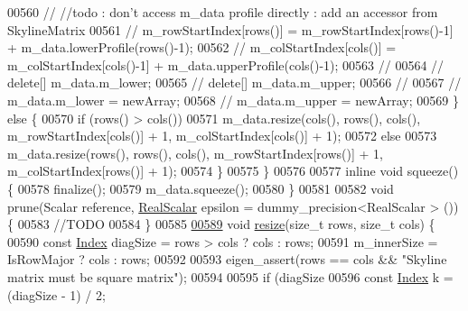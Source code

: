 \begin{DoxyCode}
00560             \textcolor{comment}{//            //todo : don't access m\_data profile directly : add an accessor from
       SkylineMatrix}
00561             \textcolor{comment}{//            m\_rowStartIndex[rows()] = m\_rowStartIndex[rows()-1] +
       m\_data.lowerProfile(rows()-1);}
00562             \textcolor{comment}{//            m\_colStartIndex[cols()] = m\_colStartIndex[cols()-1] +
       m\_data.upperProfile(cols()-1);}
00563             \textcolor{comment}{//}
00564             \textcolor{comment}{//            delete[] m\_data.m\_lower;}
00565             \textcolor{comment}{//            delete[] m\_data.m\_upper;}
00566             \textcolor{comment}{//}
00567             \textcolor{comment}{//            m\_data.m\_lower = newArray;}
00568             \textcolor{comment}{//            m\_data.m\_upper = newArray;}
00569         \} \textcolor{keywordflow}{else} \{
00570             \textcolor{keywordflow}{if} (rows() > cols())
00571                 m\_data.resize(cols(), rows(), cols(), m\_rowStartIndex[cols()] + 1, m\_colStartIndex[cols()] 
      + 1);
00572             \textcolor{keywordflow}{else}
00573                 m\_data.resize(rows(), rows(), cols(), m\_rowStartIndex[rows()] + 1, m\_colStartIndex[rows()] 
      + 1);
00574         \}
00575     \}
00576 
00577     \textcolor{keyword}{inline} \textcolor{keywordtype}{void} squeeze() \{
00578         finalize();
00579         m\_data.squeeze();
00580     \}
00581 
00582     \textcolor{keywordtype}{void} prune(Scalar reference, \hyperlink{class_eigen_1_1_skyline_matrix_base_a24c532ab7e339b956a637a4a968e1565}{RealScalar} epsilon = dummy\_precision<RealScalar > ()) \{
00583         \textcolor{comment}{//TODO}
00584     \}
00585 
\hyperlink{class_eigen_1_1_skyline_matrix_a918eed5cc583f6d402f0db60c5c5ad52}{00589}     \textcolor{keywordtype}{void} \hyperlink{class_eigen_1_1_skyline_matrix_a918eed5cc583f6d402f0db60c5c5ad52}{resize}(\textcolor{keywordtype}{size\_t} rows, \textcolor{keywordtype}{size\_t} cols) \{
00590         \textcolor{keyword}{const} \hyperlink{group___core___module_a554f30542cc2316add4b1ea0a492ff02}{Index} diagSize = rows > cols ? cols : rows;
00591         m\_innerSize = IsRowMajor ? cols : rows;
00592 
00593         eigen\_assert(rows == cols && \textcolor{stringliteral}{"Skyline matrix must be square matrix"});
00594 
00595         \textcolor{keywordflow}{if} (diagSize %
00596             \textcolor{keyword}{const} \hyperlink{group___core___module_a554f30542cc2316add4b1ea0a492ff02}{Index} k = (diagSize - 1) / 2;

\end{DoxyCode}
